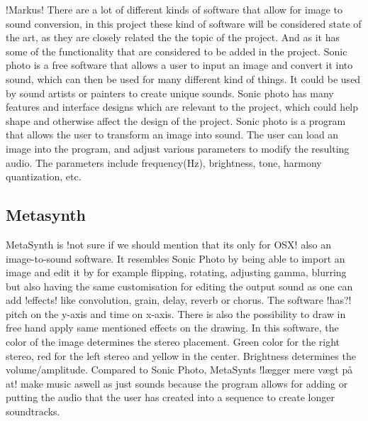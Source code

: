 !Markus!
There are a lot of different kinds of software that allow for image to sound conversion, in this project these kind of software will be considered state of the art, as they are closely related the the topic of the project. And as it has some of the functionality that are considered to be added in the project.
Sonic photo is a free software that allows a user to input an image and convert it into sound, which can then be used for many different kind of things. It could be used by sound artists or painters to create unique sounds.
Sonic photo has many features and interface designs which are relevant to the project, which could help shape and otherwise affect the design of the project.
Sonic photo is a program that allows the user to transform an image into sound. The user can load an image into the program, and adjust various parameters to modify the resulting audio. The parameters include  frequency(Hz), brightness, tone, harmony quantization, etc.


\subsection{Metasynth}\label{sub:metasynth}
MetaSynth is !not sure if we should mention that its only for OSX! also an image-to-sound software. It resembles Sonic Photo by being able to import an image and edit it by for example flipping, rotating, adjusting gamma, blurring but also having the same customisation for editing the output sound as one can add !effects! like  convolution, grain, delay, reverb or chorus. The software !has?! pitch on the y-axis and time on x-axis.
There is also the possibility to draw in free hand apply same mentioned effects on the drawing. In this software, the color of the image determines the stereo placement. Green color for the right stereo, red for the left stereo and yellow in the center. Brightness determines the volume/amplitude. 
Compared to Sonic Photo, MetaSynts !lægger mere vægt på at! make music aswell as just sounds because the program allows for adding or putting the audio that the user has created into a sequence to create longer soundtracks.


















